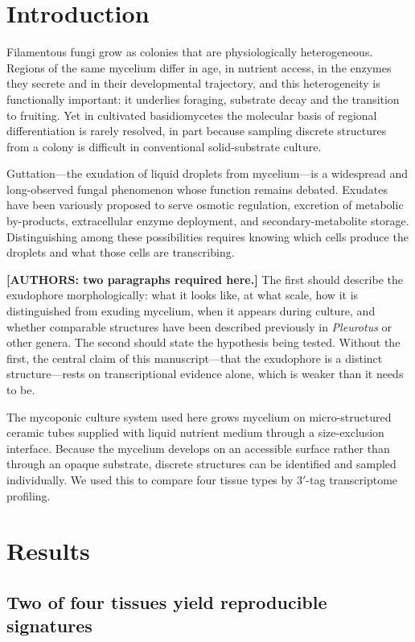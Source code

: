 \section{Introduction}

Filamentous fungi grow as colonies that are physiologically heterogeneous. Regions of the same
mycelium differ in age, in nutrient access, in the enzymes they secrete and in their
developmental trajectory, and this heterogeneity is functionally important: it underlies
foraging, substrate decay and the transition to fruiting. Yet in cultivated basidiomycetes the
molecular basis of regional differentiation is rarely resolved, in part because sampling
discrete structures from a colony is difficult in conventional solid-substrate culture.

Guttation---the exudation of liquid droplets from mycelium---is a widespread and long-observed
fungal phenomenon whose function remains debated. Exudates have been variously proposed to
serve osmotic regulation, excretion of metabolic by-products, extracellular enzyme deployment,
and secondary-metabolite storage. Distinguishing among these possibilities requires knowing
which cells produce the droplets and what those cells are transcribing.

\noindent\textbf{[AUTHORS: two paragraphs required here.]} The first should describe the
exudophore morphologically: what it looks like, at what scale, how it is distinguished from
exuding mycelium, when it appears during culture, and whether comparable structures have been
described previously in \textit{Pleurotus} or other genera. The second should state the
hypothesis being tested. Without the first, the central claim of this manuscript---that the
exudophore is a distinct structure---rests on transcriptional evidence alone, which is weaker
than it needs to be.

The mycoponic culture system used here \cite{porterfield2026mycoponics} grows mycelium on
micro-structured ceramic tubes supplied with liquid nutrient medium through a size-exclusion
interface. Because the mycelium develops on an accessible surface rather than through an opaque
substrate, discrete structures can be identified and sampled individually. We used this to
compare four tissue types by 3$'$-tag transcriptome profiling.

\section{Results}

\subsection{Two of four tissues yield reproducible signatures}

